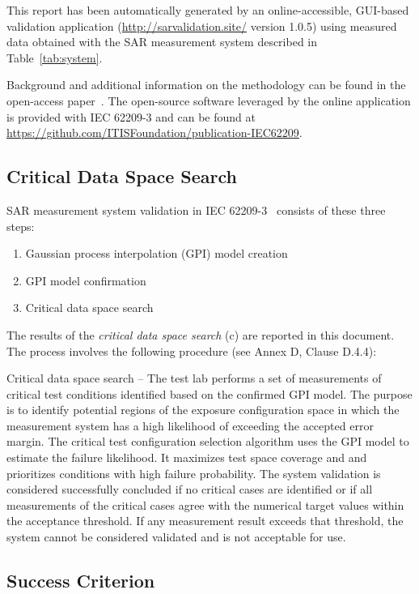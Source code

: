 \documentclass{article}
\begin{document}
This report has been automatically generated by an online-accessible, GUI-based validation application (\url{http://sarvalidation.site/} version 1.0.5) using measured data obtained with the SAR measurement system described in Table~\ref{tab:system}.

Background and additional information on the methodology can be found in the open-access paper~\cite{gpi-paper}. The open-source software leveraged by the online application is provided with IEC 62209-3 and can be found at
\url{https://github.com/ITISFoundation/publication-IEC62209}.

\subsection{Critical Data Space Search}\label{sec:procedure}
SAR measurement system validation in IEC 62209-3~\cite{standard} consists of these three steps:

\begin{enumerate}[label=\alph*)]
\item Gaussian process interpolation (GPI) model creation
\item GPI model confirmation
\item Critical data space search
\end{enumerate}

The results of the \textit{critical data space search} (c) are reported in this document. The process involves the following procedure (see Annex D, Clause D.4.4):

Critical data space search -- The test lab performs a set of measurements of critical test conditions identified based on the confirmed GPI model. The purpose is to identify potential regions of the exposure configuration space in which the measurement system has a high likelihood of exceeding the accepted error margin. The critical test configuration selection algorithm uses the GPI model to estimate the failure likelihood. It  maximizes test space coverage and and prioritizes conditions with high failure probability. The system validation is considered successfully concluded if no critical cases are identified or if all measurements of the critical cases agree with the numerical target values within the acceptance threshold. If any measurement result exceeds that threshold, the system cannot be considered validated and is not acceptable for use.

\subsection{Success Criterion}\label{sec:quantities}
\end{document}
